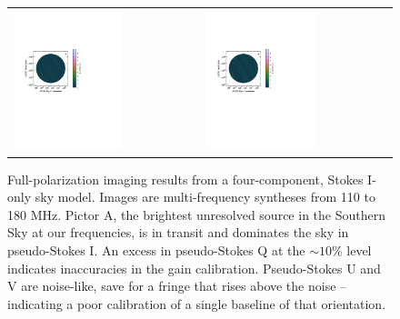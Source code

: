 \begin{figure}
\begin{tabular}{ll}
\includegraphics[clip, trim=0.1cm 11cm 6cm 6cm, width=0.6\textwidth]{chapters/polcal/figures/68380-U.pdf} &
\includegraphics[clip, trim=0.1cm 11cm 6cm 6cm, width=0.6\textwidth]{chapters/polcal/figures/68380-V.pdf} \\
\end{tabular}
\caption[Full-polarization imaging results from a four-component, Stokes I-only sky model.]{Full-polarization imaging results from a four-component, Stokes I-only sky model. Images are multi-frequency syntheses from 110 to 180 MHz. Pictor A, the brightest unresolved source in the Southern Sky at our frequencies, is in transit and dominates the sky in pseudo-Stokes I. An excess in pseudo-Stokes Q at the $\sim10$\% level indicates inaccuracies in the gain calibration. Pseudo-Stokes U and V are noise-like, save for a fringe that rises above the noise -- indicating a poor calibration of a single baseline of that orientation.}
\label{fig:polcal_img_PicA}
\end{figure}


